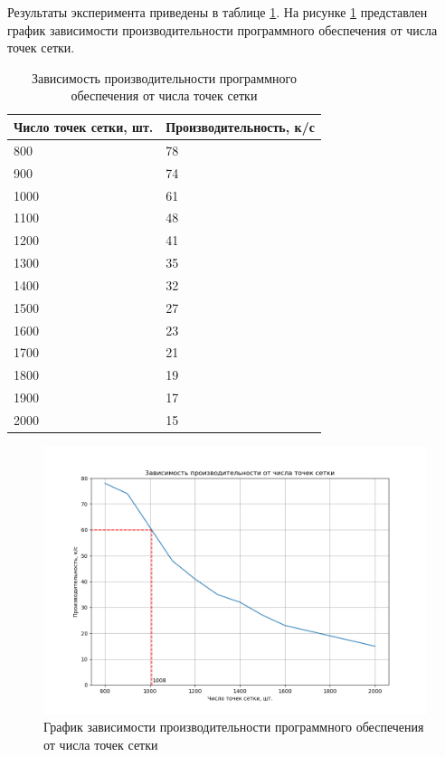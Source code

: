 Результаты эксперимента приведены в таблице \ref{tab:test}. На рисунке \ref{img:test} представлен график зависимости производительности программного обеспечения от числа точек сетки.

\begin{table}[h]
    \caption{Зависимость производительности программного обеспечения от числа точек сетки}
    \begin{center}
        \begin{tabular}{|l|l|}
            \hline
            Число точек сетки, шт. & Производительность, к/с \\ \hline
            800 & 78 \\ \hline
		    900 & 74 \\ \hline
            1000 & 61 \\ \hline
            1100 & 48 \\ \hline
            1200 & 41 \\ \hline
            1300 & 35 \\ \hline
            1400 & 32 \\ \hline
            1500 & 27 \\ \hline
            1600 & 23 \\ \hline
            1700 & 21 \\ \hline
            1800 & 19 \\ \hline
            1900 & 17 \\ \hline
            2000 & 15 \\ \hline
        \end{tabular}
    \end{center}
    \label{tab:test}
\end{table}

\begin{figure}[H]
	\begin{center}
		\includegraphics[scale=0.6]{img/test.png}
	\end{center}
	\captionsetup{justification=centering}
	\caption{График зависимости производительности программного обеспечения от числа точек сетки}
	\label{img:test}
\end{figure}

